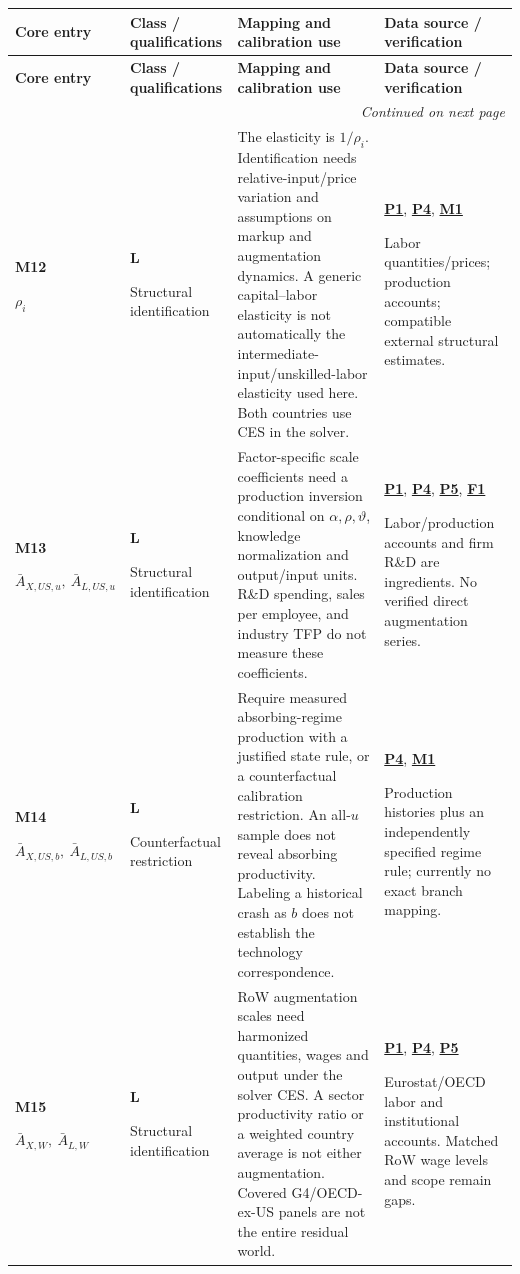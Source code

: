 \documentclass[10pt,a4paper,landscape]{article}
\makeatletter
\newenvironment{measuretable}{%
\fontsize{9.4}{10.8}\selectfont\setlength{\parskip}{1pt}
\begin{longtable}{@{}P{\dimexpr .14\textwidth-4.2pt\relax}P{\dimexpr .135\textwidth-4.05pt\relax}P{\dimexpr .455\textwidth-13.65pt\relax}P{\dimexpr .27\textwidth-8.1pt\relax}@{}}
\toprule\rowcolor{tablehead}\textbf{Core entry} & \textbf{Class / qualifications} & \textbf{Mapping and calibration use} & \textbf{Data source / verification}\\\midrule
\endfirsthead
\toprule\rowcolor{tablehead}\textbf{Core entry} & \textbf{Class / qualifications} & \textbf{Mapping and calibration use} & \textbf{Data source / verification}\\\midrule
\endhead\midrule\multicolumn{4}{r}{\footnotesize\itshape Continued on next page}\\\endfoot
\bottomrule\endlastfoot
}{\end{longtable}}
\makeatother
\begin{document}
\begin{measuretable}
\textbf{M12}\par $\rho_i$ & \textbf{L}\par Structural identification & The elasticity is $1/\rho_i$. Identification needs relative-input/price variation and assumptions on markup and augmentation dynamics. A generic capital--labor elasticity is not automatically the intermediate-input/unskilled-labor elasticity used here. Both countries use CES in the solver. & \hyperlink{src-P1}{\textbf{P1}}, \hyperlink{src-P4}{\textbf{P4}}, \hyperlink{src-M1}{\textbf{M1}}\par Labor quantities/prices; production accounts; compatible external structural estimates.\\[4pt]
\textbf{M13}\par $\bar A_{X,US,u},\ \bar A_{L,US,u}$ & \textbf{L}\par Structural identification & Factor-specific scale coefficients need a production inversion conditional on $\alpha,\rho,\vartheta$, knowledge normalization and output/input units. R\&D spending, sales per employee, and industry TFP do not measure these coefficients. & \hyperlink{src-P1}{\textbf{P1}}, \hyperlink{src-P4}{\textbf{P4}}, \hyperlink{src-P5}{\textbf{P5}}, \hyperlink{src-F1}{\textbf{F1}}\par Labor/production accounts and firm R\&D are ingredients. No verified direct augmentation series.\\[4pt]
\textbf{M14}\par $\bar A_{X,US,b},\ \bar A_{L,US,b}$ & \textbf{L}\par Counterfactual restriction & Require measured absorbing-regime production with a justified state rule, or a counterfactual calibration restriction. An all-$u$ sample does not reveal absorbing productivity. Labeling a historical crash as $b$ does not establish the technology correspondence. & \hyperlink{src-P4}{\textbf{P4}}, \hyperlink{src-M1}{\textbf{M1}}\par Production histories plus an independently specified regime rule; currently no exact branch mapping.\\[4pt]
\textbf{M15}\par $\bar A_{X,W},\ \bar A_{L,W}$ & \textbf{L}\par Structural identification & RoW augmentation scales need harmonized quantities, wages and output under the solver CES. A sector productivity ratio or a weighted country average is not either augmentation. Covered G4/OECD-ex-US panels are not the entire residual world. & \hyperlink{src-P1}{\textbf{P1}}, \hyperlink{src-P4}{\textbf{P4}}, \hyperlink{src-P5}{\textbf{P5}}\par Eurostat/OECD labor and institutional accounts. Matched RoW wage levels and scope remain gaps.\\[4pt]

\end{measuretable}
\end{document}
